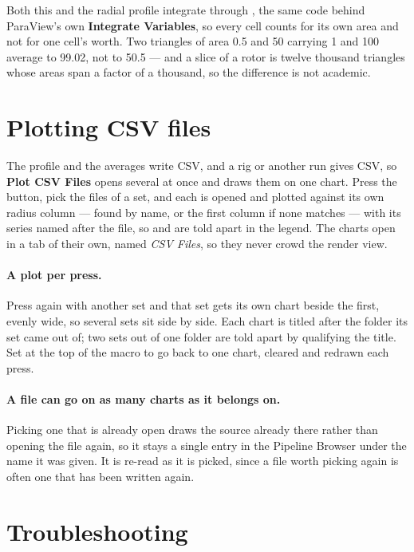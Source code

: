 \documentclass[11pt,a4paper]{article}
\newcommand{\menu}[1]{\textbf{#1}}          %
\begin{document}
Both this and the radial profile integrate through ,
the same code behind ParaView's own \menu{Integrate Variables}, so every cell
counts for its own area and not for one cell's worth. Two triangles of area 0.5
and 50 carrying 1 and 100 average to 99.02, not to 50.5 --- and a slice of a
rotor is twelve thousand triangles whose areas span a factor of a thousand, so
the difference is not academic.

\section{Plotting CSV files}

The profile and the averages write CSV, and a rig or another run gives CSV, so
\menu{Plot CSV Files} opens several at once and draws them on one chart. Press
the button, pick the files of a set, and each is opened and plotted against its
own radius column --- found by name, or the first column if none matches --- with
its series named after the file, so  and
 are told apart in the legend. The charts open in a tab of
their own, named \emph{CSV Files}, so they never crowd the render view.

\paragraph{A plot per press.} Press again with another set and that set gets its
own chart beside the first, evenly wide, so several sets sit side by side. Each
chart is titled after the folder its set came out of; two sets out of one folder
are told apart by qualifying the title. Set  at the
top of the macro to go back to one chart, cleared and redrawn each press.

\paragraph{A file can go on as many charts as it belongs on.} Picking one that is
already open draws the source already there rather than opening the file again,
so it stays a single entry in the Pipeline Browser under the name it was given.
It is re-read as it is picked, since a file worth picking again is often one that
has been written again.

\section{Troubleshooting}
\end{document}
